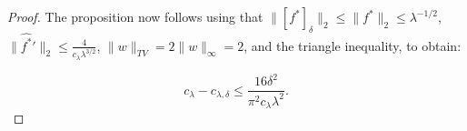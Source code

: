 \begin{proposition}
\begin{proof}
The proposition now follows using that $\|[f^*]_{\delta}\|_2\leq \|f^*\|_{2} \le \lambda^{-1/2}$, $\|\hat {f^*}'\|_{2} \le \frac{4}{c_\lambda \lambda^{3/2}}$, $\|w\|_{TV}=2\|w\|_{\infty}=2$, and the triangle inequality, to obtain:

\begin{equation}
    c_\lambda-c_{\lambda,\delta} \le \frac{16\delta^2}{\pi^2c_{\lambda}\lambda^2}.
\end{equation}

\end{proof}


\end{proposition}

